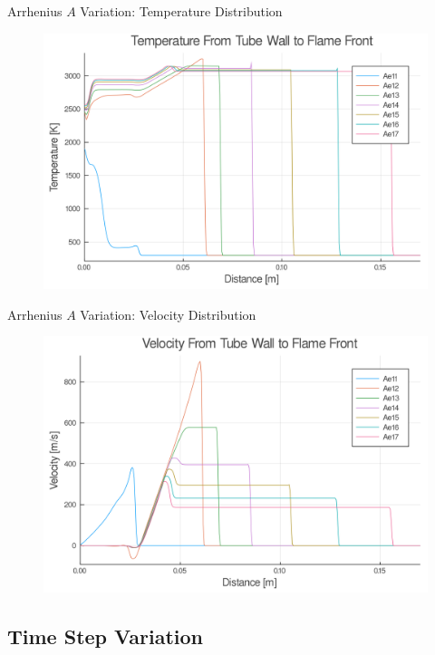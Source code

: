 \begin{frame}{Arrhenius $A$ Variation: Temperature Distribution}
\begin{figure}
\centering
\includegraphics[width=0.8\linewidth]{../figs/Atest/t.png}
\end{figure}
\end{frame}

\begin{frame}{Arrhenius $A$ Variation: Velocity Distribution}
\begin{figure}
\centering
\includegraphics[width=0.8\linewidth]{../figs/Atest/u.png}
\end{figure}
\end{frame}

\subsection{Time Step Variation}


